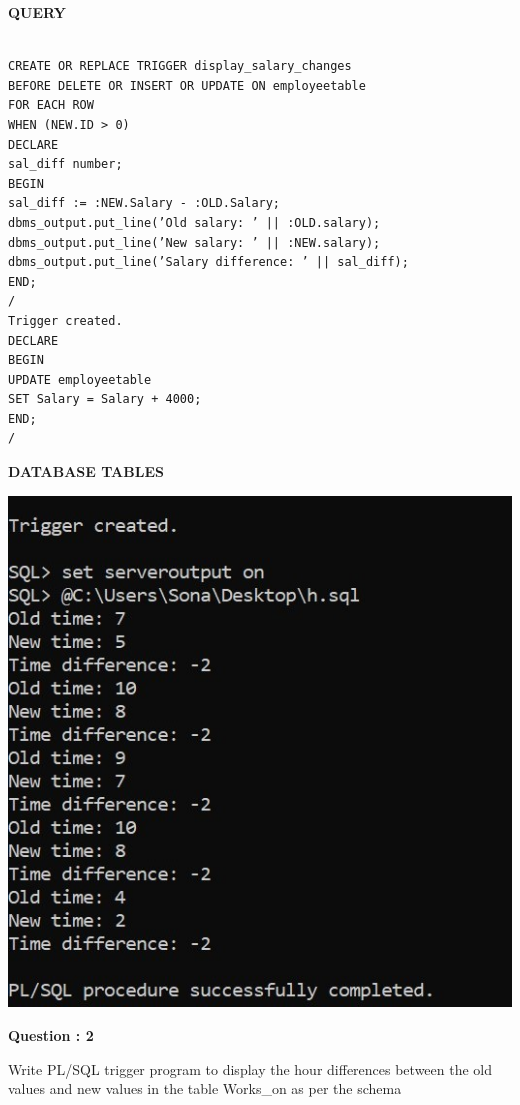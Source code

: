 \documentclass[a4paper,12pt]{report}
\begin{document}
\begin{flushleft}
\textbf{QUERY }
\end{flushleft}
 \begin{verbatim}

CREATE OR REPLACE TRIGGER display_salary_changes
BEFORE DELETE OR INSERT OR UPDATE ON employeetable
FOR EACH ROW
WHEN (NEW.ID > 0)
DECLARE
sal_diff number;
BEGIN
sal_diff := :NEW.Salary - :OLD.Salary;
dbms_output.put_line(’Old salary: ’ || :OLD.salary);
dbms_output.put_line(’New salary: ’ || :NEW.salary);
dbms_output.put_line(’Salary difference: ’ || sal_diff);
END;
/
Trigger created.
DECLARE
BEGIN
UPDATE employeetable
SET Salary = Salary + 4000;
END;
/
\end{verbatim}
\begin{flushleft}
\textbf{DATABASE TABLES}
\end{flushleft}
\includegraphics[scale=1]{trigger1.jpg}

\begin{flushleft}
    \textbf{Question : 2}
\end{flushleft}
Write PL/SQL trigger program to display the hour differences between the old values and new values in the table Works\_on as per the schema
\end{document}
